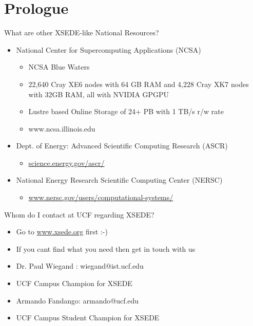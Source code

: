 \documentclass[compress,10pt]{beamer}
\begin{document}
\section{Prologue}

\begin{frame}{What are other XSEDE-like National Resources?}
\begin{itemize}

\pause
\item National Center for Supercomputing Applications (NCSA)
\begin{itemize}
\item NCSA Blue Waters 
\item 22,640 Cray XE6 nodes with 64 GB RAM and 4,228 Cray XK7 nodes with 32GB RAM, all with NVIDIA GPGPU
\item Lustre based Online Storage of 24+ PB with 1 TB/s r/w rate
\item www.ncsa.illinois.edu
\end{itemize}

\pause
\item Dept. of Energy: Advanced Scientific Computing Research (ASCR)
\begin{itemize}
\item \url{science.energy.gov/ascr/}
\end{itemize}

\pause
\item National Energy Research Scientific Computing Center (NERSC)
\begin{itemize}
\item\url{www.nersc.gov/users/computational-systems/}
\end{itemize}

\end{itemize}
\end{frame}



\begin{frame}{Whom do I contact at UCF regarding XSEDE?}
\begin{itemize}
\item Go to \url{www.xsede.org} first :-)
\pause
\item If you cant find what you need then get in touch with us
\bigskip
\item Dr. Paul Wiegand : wiegand@ist.ucf.edu
\item UCF Campus Champion for XSEDE
\bigskip
\item Armando Fandango: armando@ucf.edu
\item UCF Campus Student Champion for XSEDE
\end{itemize}

\end{frame}
\end{document}
